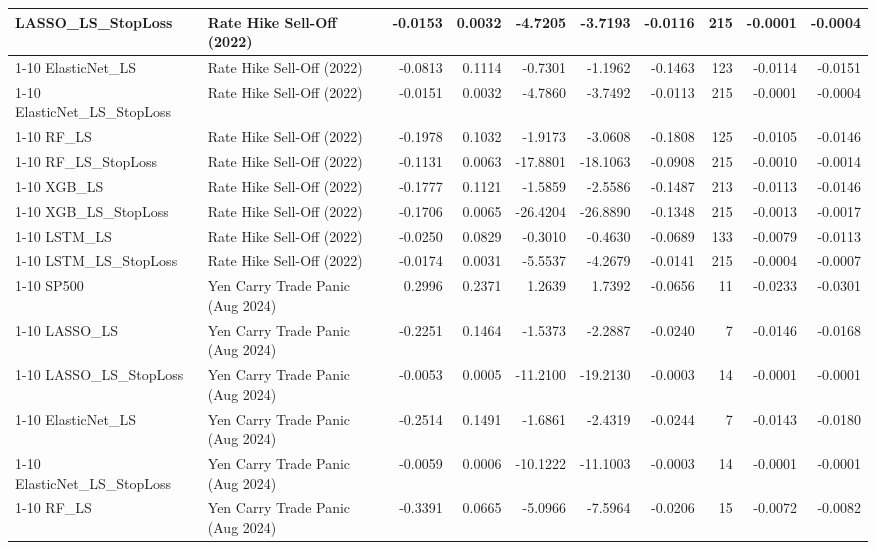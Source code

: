 \begin{tabular}{llrrrrrrrr}
LASSO\_LS\_StopLoss & Rate Hike Sell-Off (2022) & -0.0153 & 0.0032 & -4.7205 & -3.7193 & -0.0116 & 215 & -0.0001 & -0.0004 \\
\cline{1-10}
ElasticNet\_LS & Rate Hike Sell-Off (2022) & -0.0813 & 0.1114 & -0.7301 & -1.1962 & -0.1463 & 123 & -0.0114 & -0.0151 \\
\cline{1-10}
ElasticNet\_LS\_StopLoss & Rate Hike Sell-Off (2022) & -0.0151 & 0.0032 & -4.7860 & -3.7492 & -0.0113 & 215 & -0.0001 & -0.0004 \\
\cline{1-10}
RF\_LS & Rate Hike Sell-Off (2022) & -0.1978 & 0.1032 & -1.9173 & -3.0608 & -0.1808 & 125 & -0.0105 & -0.0146 \\
\cline{1-10}
RF\_LS\_StopLoss & Rate Hike Sell-Off (2022) & -0.1131 & 0.0063 & -17.8801 & -18.1063 & -0.0908 & 215 & -0.0010 & -0.0014 \\
\cline{1-10}
XGB\_LS & Rate Hike Sell-Off (2022) & -0.1777 & 0.1121 & -1.5859 & -2.5586 & -0.1487 & 213 & -0.0113 & -0.0146 \\
\cline{1-10}
XGB\_LS\_StopLoss & Rate Hike Sell-Off (2022) & -0.1706 & 0.0065 & -26.4204 & -26.8890 & -0.1348 & 215 & -0.0013 & -0.0017 \\
\cline{1-10}
LSTM\_LS & Rate Hike Sell-Off (2022) & -0.0250 & 0.0829 & -0.3010 & -0.4630 & -0.0689 & 133 & -0.0079 & -0.0113 \\
\cline{1-10}
LSTM\_LS\_StopLoss & Rate Hike Sell-Off (2022) & -0.0174 & 0.0031 & -5.5537 & -4.2679 & -0.0141 & 215 & -0.0004 & -0.0007 \\
\cline{1-10}
SP500 & Yen Carry Trade Panic (Aug 2024) & 0.2996 & 0.2371 & 1.2639 & 1.7392 & -0.0656 & 11 & -0.0233 & -0.0301 \\
\cline{1-10}
LASSO\_LS & Yen Carry Trade Panic (Aug 2024) & -0.2251 & 0.1464 & -1.5373 & -2.2887 & -0.0240 & 7 & -0.0146 & -0.0168 \\
\cline{1-10}
LASSO\_LS\_StopLoss & Yen Carry Trade Panic (Aug 2024) & -0.0053 & 0.0005 & -11.2100 & -19.2130 & -0.0003 & 14 & -0.0001 & -0.0001 \\
\cline{1-10}
ElasticNet\_LS & Yen Carry Trade Panic (Aug 2024) & -0.2514 & 0.1491 & -1.6861 & -2.4319 & -0.0244 & 7 & -0.0143 & -0.0180 \\
\cline{1-10}
ElasticNet\_LS\_StopLoss & Yen Carry Trade Panic (Aug 2024) & -0.0059 & 0.0006 & -10.1222 & -11.1003 & -0.0003 & 14 & -0.0001 & -0.0001 \\
\cline{1-10}
RF\_LS & Yen Carry Trade Panic (Aug 2024) & -0.3391 & 0.0665 & -5.0966 & -7.5964 & -0.0206 & 15 & -0.0072 & -0.0082 \\

\end{tabular}
